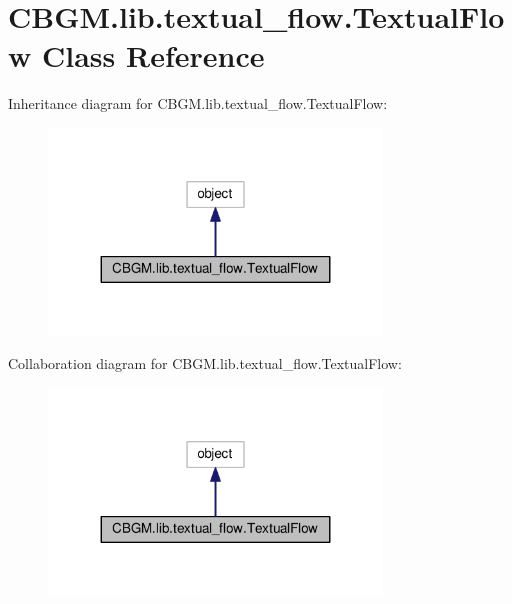 \hypertarget{classCBGM_1_1lib_1_1textual__flow_1_1TextualFlow}{}\section{C\+B\+G\+M.\+lib.\+textual\+\_\+flow.\+Textual\+Flow Class Reference}
\label{classCBGM_1_1lib_1_1textual__flow_1_1TextualFlow}


Inheritance diagram for C\+B\+G\+M.\+lib.\+textual\+\_\+flow.\+Textual\+Flow\+:\nopagebreak
\begin{figure}[H]
\begin{center}
\leavevmode
\includegraphics[width=251pt]{classCBGM_1_1lib_1_1textual__flow_1_1TextualFlow__inherit__graph}
\end{center}
\end{figure}


Collaboration diagram for C\+B\+G\+M.\+lib.\+textual\+\_\+flow.\+Textual\+Flow\+:\nopagebreak
\begin{figure}[H]
\begin{center}
\leavevmode
\includegraphics[width=251pt]{classCBGM_1_1lib_1_1textual__flow_1_1TextualFlow__coll__graph}
\end{center}
\end{figure}
